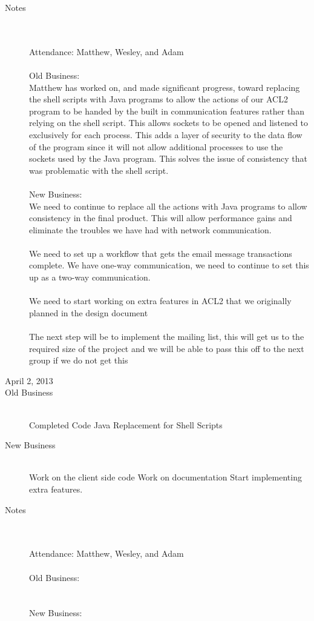 \documentclass[11pt, letterpaper]{report}
\begin{document}
\begin{description}
\item[Notes] \hfill \\ \hfill \\
Attendance:  Matthew, Wesley, and Adam\\ \\
Old Business: \\
Matthew has worked on, and made significant progress, toward replacing the shell scripts with Java programs to allow the actions of our ACL2 program to be handed by the built in communication features rather than relying on the shell script. This allows sockets to be opened and listened to exclusively for each process. This adds a layer of security to the data flow of the program since it will not allow additional processes to use the sockets used by the Java program. This solves the issue of consistency that was problematic with the shell script. 
\\ \\
New Business:\\
We need to continue to replace all the actions with Java programs to allow consistency in the final product. This will allow performance gains and eliminate the troubles we have had with network communication. \\ \\
We need to set up a workflow that gets the email message transactions complete. We have one-way communication, we need to continue to set this up as a two-way communication.\\\\
We need to start working on extra features in ACL2 that we originally planned in the design document \\ \\
The next step will be to implement the mailing list, this will get us to the required size of the project and we will be able to pass this off to the next group if we do not get this 



\newpage
\item[\Large April 2, 2013]
\hypertarget{April 2, 2013} {}
\item[Old Business] \hfill \\
\subitem Completed Code
\subitem Java Replacement for Shell Scripts
\item[New Business] \hfill \\
\subitem Work on the client side code
\subitem Work on documentation
\subitem Start implementing extra features.

\item[Notes] \hfill \\ \hfill \\
Attendance:  Matthew, Wesley, and Adam\\ \\
Old Business: \\
\\ \\
New Business:\\

\end{description}
\end{document}
